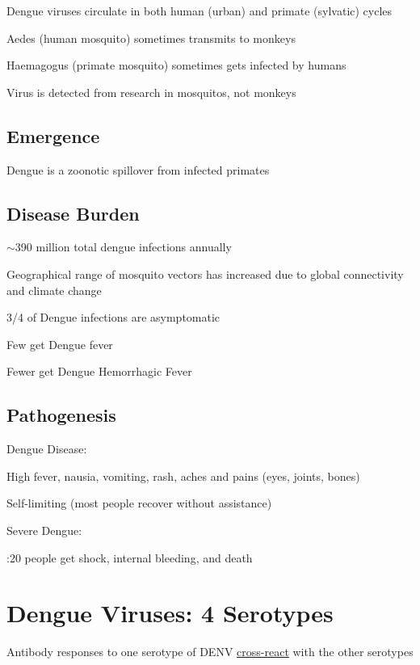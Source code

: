 \documentclass{notes}
\begin{document}
Dengue viruses circulate in both human (urban) and primate (sylvatic) cycles

\tab Aedes (human mosquito) sometimes transmits to monkeys

\tab Haemagogus (primate mosquito) sometimes gets infected by humans

Virus is detected from research in mosquitos, not monkeys

\subsection{Emergence}

Dengue is a zoonotic spillover from infected primates


\subsection{Disease Burden}

\(\sim\)390 million total dengue infections annually

Geographical range of mosquito vectors has increased due to global connectivity and climate change

3/4 of Dengue infections are asymptomatic

\tab Few get Dengue fever

\tab \tab Fewer get Dengue Hemorrhagic Fever

\subsection{Pathogenesis}

Dengue Disease:

\tab High fever, nausia, vomiting, rash, aches and pains (eyes, joints, bones)

Self-limiting (most people recover without assistance)

Severe Dengue:

:20 people get shock, internal bleeding, and death

\section{Dengue Viruses: 4 Serotypes}

Antibody responses to one serotype of DENV \underline{cross-react} with the other serotypes
\end{document}
